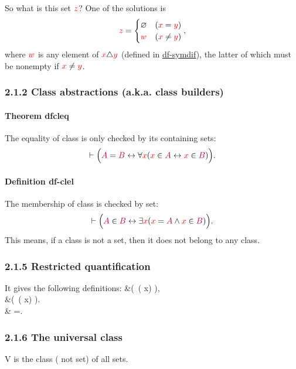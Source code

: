 \documentclass[12pt, letterpaper]{article}
\newcommand{\red}[1]{{\color{red} #1}}
\newcommand{\blue}[1]{{\color{blue} #1}}
\newcommand{\purple}[1]{{\color{purple} #1}}
\renewcommand{\emptyset}{\varnothing}
\newcommand{\symdif}{\triangle}
\newcommand{\provable}{\vdash}
\newcommand{\ra}{\rightarrow}
\newcommand{\lra}{\leftrightarrow}
\newcommand{\setvar}{\red}
\newcommand{\wff}{\blue}
\newcommand{\classvar}{\purple}
\newcommand{\wffphi}{\wff{\varphi}}
\newcommand{\sx}{\setvar{x}}
\newcommand{\clA}{\classvar{A}}
\newcommand{\clB}{\classvar{B}}
\newcommand{\VV}{\mathrm{V}}
\newenvironment{eqlong}{\equation\aligned}{\endaligned\endequation}
\theoremstyle{definition}
\theoremstyle{remark}
\theoremstyle{definition}
\theoremstyle{plain}
\begin{document}
	So what is this set $\setvar{z}$?
	One of the solutions is
	\begin{equation}
		\setvar{z} = \begin{cases}
			\emptyset & (\setvar{x}=\setvar{y})\\
			\setvar{w} & (\setvar{x}\ne\setvar{y})\\
		\end{cases},
	\end{equation}
	where $\setvar{w}$ is any element of $\setvar{x}\symdif\setvar{y}$ (defined in \href{http://us.metamath.org/mpeuni/mmtheorems38.html#mm3709s}
	{df-symdif}), the latter of which must be nonempty if $\setvar{x}\ne \setvar{y}$.
	
	\subsubsection*{2.1.2  Class abstractions (a.k.a. class builders)}
	\paragraph{Theorem dfcleq}
	The equality of class is only checked by its containing sets:
	\[\provable \Big(\clA=\clB\lra\forall \sx(\sx\in\clA\lra\sx\in\clB) \Big). \]
	\paragraph{Definition df-clel}
	The membership of class is checked by set:
	\[\provable \Big(\clA\in\clB\lra\exists\sx(\sx=\clA\land\sx\in\clB)\Big). \]
	This means, if a class is not a set, then it does not belong to any class.
	
	\subsubsection*{2.1.5  Restricted quantification}
	It gives the following definitions:
	\begin{eqlong}
		&\provable \Big(\forall \sx\in\clA\,\wffphi \lra\forall \sx(\sx\in\clA\ra\wffphi) \Big),\\
		&\provable \Big(\exists \sx\in\clA\,\wffphi \lra\exists \sx(\sx\in\clA\land\wffphi) \Big).\\
		&\provable  \set{\sx\in\clA|\wffphi} =\set{\sx|(\sx\in\clA\land\wffphi)}.\\		
	\end{eqlong}	
	
	\subsubsection*{2.1.6  The universal class}
	$\VV$ is the class (\blue{not set}) of all sets.
	
\end{document}
